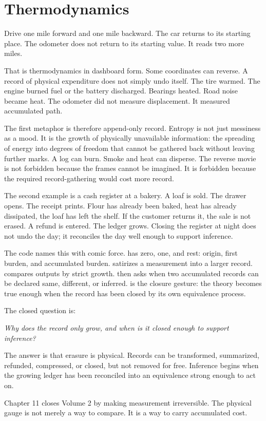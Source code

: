 \chapter{Thermodynamics}
\label{chap:thermodynamics}


\begin{chapteressay}

Drive one mile forward and one mile backward. The car returns to its starting
place. The odometer does not return to its starting value. It reads two more
miles.

That is thermodynamics in dashboard form. Some coordinates can reverse. A
record of physical expenditure does not simply undo itself. The tire warmed.
The engine burned fuel or the battery discharged. Bearings heated. Road noise
became heat. The odometer did not measure displacement. It measured accumulated
path.

The first metaphor is therefore append-only record. Entropy is not just
messiness as a mood. It is the growth of physically unavailable information:
the spreading of energy into degrees of freedom that cannot be gathered back
without leaving further marks. A log can burn. Smoke and heat can disperse.
The reverse movie is not forbidden because the frames cannot be imagined. It
is forbidden because the required record-gathering would cost more record.

The second example is a cash register at a bakery. A loaf is sold. The drawer
opens. The receipt prints. Flour has already been baked, heat has already
dissipated, the loaf has left the shelf. If the customer returns it, the sale
is not erased. A refund is entered. The ledger grows. Closing the register at
night does not undo the day; it reconciles the day well enough to support
inference.

The code names this with comic force.  has zero, one, and rest:
origin, first burden, and accumulated burden.  satirizes a
measurement into a larger record.  compares outputs by strict
growth.  then asks when two accumulated records can be declared
same, different, or inferred.  is the closure gesture:
the theory becomes true enough when the record has been closed by its own
equivalence process.

The closed question is:

\begin{center}
\emph{Why does the record only grow, and when is it closed enough to support
inference?}
\end{center}

The answer is that erasure is physical. Records can be transformed, summarized,
refunded, compressed, or closed, but not removed for free. Inference begins
when the growing ledger has been reconciled into an equivalence strong enough
to act on.

Chapter 11 closes Volume 2 by making measurement irreversible. The physical
gauge is not merely a way to compare. It is a way to carry accumulated cost.

\end{chapteressay}

